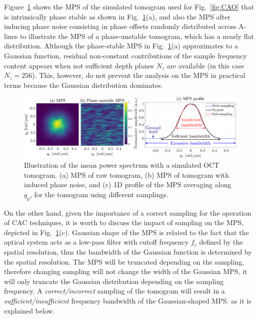  Figure~\ref{fig:MPSExample} shows the MPS of the simulated tomogram used for Fig.~\ref{fig:CAO} that is intrinsically phase stable as shown in Fig.~\ref{fig:MPSExample}(a), and also the MPS after inducing phase noise consisting in phase offsets randomly distributed across A-lines to illustrate the MPS of a phase-unstable tomogram, which has a nearly flat distribution. Although the phase-stable MPS in Fig.~\ref{fig:MPSExample}(a) approximates to a Gaussian function, residual non-constant contributions of the sample frequency content appears when not sufficient depth planes $N_z$ are available (in this case $N_z = 256$). This, however, do not prevent the analysis on the MPS in practical terms because the Gaussian distribution dominates.

\begin{figure}[htb!]
	\centering
	\includegraphics[width=\textwidth]{Figures/SHARP/PhaseStabilization/MPSExample.pdf}
	\caption[Illustration of the mean power spectrum with a simulated OCT tomogram.]{Illustration of the mean power spectrum with a simulated OCT tomogram. (a) MPS of raw tomogram, (b) MPS of tomogram with induced phase noise, and (c) 1D profile of the MPS averaging along $q_y$, for the tomogram using different samplings.}
	\label{fig:MPSExample}
\end{figure}

On the other hand, given the importance of a correct sampling for the operation of CAC techniques, it is worth to discuss the impact of sampling on the MPS, depicted in Fig.~\ref{fig:MPSExample}(c). Gaussian shape of the MPS is related to the fact that the optical system acts as a low-pass filter with cutoff frequency $f_c$ defined by the spatial resolution, thus the bandwidth of the Gaussian function is determined by the spatial resolution. The MPS will be truncated depending on the sampling, therefore changing sampling will not change the width of the Gaussian MPS, it will only truncate the Gaussian distribution depending on the sampling frequency. A \textit{correct/incorrect} sampling of the tomogram will result in a \textit{sufficient/insufficient} frequency bandwidth of the Gaussian-shaped MPS. as it is explained below.

